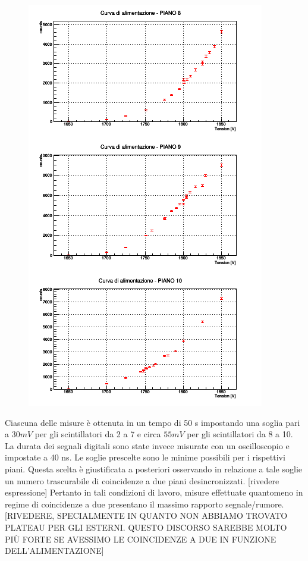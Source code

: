 \documentclass[11pt]{article}
\begin{document}
\begin{flushleft}
\begin{figure}
\includegraphics{"plateau_altri"}
\end{figure}

Ciascuna delle misure è ottenuta in un tempo di 50 s impostando una soglia pari a $30 mV$ per gli scintillatori da 2 a 7 e circa $55 mV$ per gli scintillatori da 8 a 10. La durata dei segnali digitali sono state invece misurate con un oscilloscopio e impostate a 40 ns. Le soglie prescelte sono le minime possibili per i rispettivi piani. Questa scelta è giustificata a posteriori osservando in relazione a tale soglie un numero trascurabile di coincidenze a due piani desincronizzati. [rivedere espressione] Pertanto in tali condizioni di lavoro, misure effettuate quantomeno in regime di coincidenze a due presentano il massimo rapporto segnale/rumore. [RIVEDERE, SPECIALMENTE IN QUANTO NON ABBIAMO TROVATO PLATEAU PER GLI ESTERNI. QUESTO DISCORSO SAREBBE MOLTO PIÙ FORTE SE AVESSIMO LE COINCIDENZE A DUE IN FUNZIONE DELL'ALIMENTAZIONE]


\end{flushleft}
\end{document}
